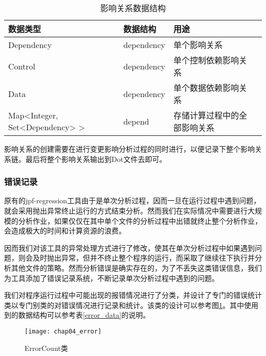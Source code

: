 \begin{table}
	\caption{影响关系数据结构}
	\label{track_data}
	\centering
	\begin{tabular}{lllc}
		\toprule[1.5pt]
		{\heiti 数据类型} &{\heiti 数据结构} & {\heiti 用途} \\\midrule[1pt]
		Dependency & dependency & 单个影响关系 \\
		Control & dependency & 单个控制依赖影响关系 \\
		Data & dependency & 单个数据依赖影响关系 \\
		Map<Integer, Set<Dependency> > & depend & 存储计算过程中的全部影响关系\\
		\bottomrule[1.5pt]
	\end{tabular}
\end{table}

影响关系的创建需要在进行变更影响分析过程的同时进行，以便记录下整个影响关系链。最后将整个影响关系输出到Dot文件去即可。


\subsubsection{错误记录}

原有的jpf-regression工具由于是单次分析过程，因而一旦在运行过程中遇到问题，就会采用抛出异常终止运行的方式结束分析。然而我们在实际情况中需要进行大规模的分析作业，如果仅仅在其中单个文件的分析过程中出错就终止整个分析作业，会造成极大的时间和计算资源的浪费。

因而我们对该工具的异常处理方式进行了修改，使其在单次分析过程中如果遇到问题，则会及时抛出异常，但并不终止整个程序的运行，而采取了继续往下执行并分析其他文件的策略。然而分析错误是确实存在的，为了不丢失这类错误信息，我们为工具添加了错误记录系统，不断记录单次分析过程中遇到的问题。

我们对程序运行过程中可能出现的报错情况进行了分类，并设计了专门的错误统计类以专门别类的对错误情况进行记录和统计。该类的设计可以参考图\ref {class_error}。其中使用到的数据结构可以参考表\ref {error_data}的说明。

\begin{figure}[H]
	\centering
	\texttt{[image: chap04\_error]}
	\caption {ErrorCount类}
	\label {class_error}	
\end{figure}

